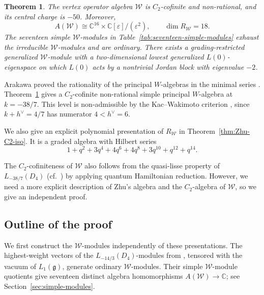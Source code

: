 \documentclass[11pt]{amsart}
\numberwithin{equation}{section}
\newtheorem{theorem}{Theorem}[section]
\theoremstyle{definition}
\theoremstyle{remark}
\newcommand{\CC}{\mathbb C}
\newcommand{\g}{\mathfrak g}
\begin{document}
\begin{theorem}\label{thm:main}
The vertex operator algebra $\mathcal W$ is $C_2$-cofinite and
non-rational, and its central charge is $-50$. Moreover,
\[
 A(\mathcal W)\cong
 \CC^{16}\times\CC[\varepsilon]/(\varepsilon^2),
 \qquad \dim R_{\mathcal W}=18.
\]
The seventeen simple $\mathcal W$-modules in
Table~\ref{tab:seventeen-simple-modules} exhaust the irreducible
$\mathcal W$-modules and are ordinary.
There exists a grading-restricted generalized
$\mathcal W$-module with a two-dimensional lowest generalized
$L(0)$-eigenspace on which $L(0)$ acts by a nontrivial Jordan block
with eigenvalue $-2$.
\end{theorem}
Arakawa proved the rationality of the principal $W$-algebras in the
minimal series \cite{AraMin}.
Theorem~\ref{thm:main} gives a $C_2$-cofinite non-rational simple
principal $W$-algebra at $k=-38/7$. This level is non-admissible
by the Kac--Wakimoto criterion \cite[Proposition~3.1]{AraAdm},
since $k+h^\vee=4/7$ has numerator $4<h^\vee=6$.



We also give an explicit polynomial presentation of
$R_{\mathcal W}$ in
Theorem~\ref{thm:Zhu-C2-iso}. It is a graded algebra
with Hilbert series
\[
 1+q^2+3q^4+4q^6+4q^8+3q^{10}+q^{12}+q^{14}.
\]

The $C_2$-cofiniteness of $\mathcal W$ also follows from
the quasi-lisse property of $L_{-38/7}(D_4)$
(cf.~\cite[Theorem~1.1 and Appendix~B, Table~12]{ADS})
by applying quantum Hamiltonian reduction.
However, we need a more explicit description of Zhu's algebra
and the $C_2$-algebra of $\mathcal W$, so we give an independent proof.


\subsection*{Outline of the proof}

We first construct the $\mathcal W$-modules independently of
these presentations. The highest-weight vectors of the
$L_{-14/3}(D_4)$-modules from \cite{AV}, tensored with the vacuum
of $L_1(\g)$, generate ordinary $\mathcal W$-modules.
Their simple $\mathcal W$-module quotients give seventeen
distinct algebra homomorphisms $A(\mathcal W)\longrightarrow\CC$;
see Section~\ref{sec:simple-modules}.
\end{document}
